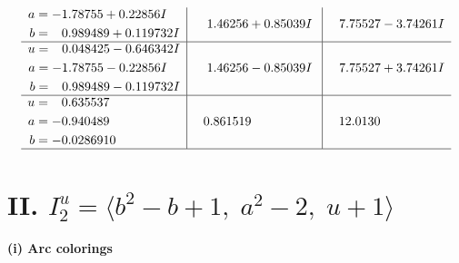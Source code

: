 \documentclass[1p]{elsarticle_modified}
\theoremstyle{definition}
\begin{document}
$$\begin{array}{c|c|c}
\begin{aligned}
a &= -1.78755 + 0.22856 I \\
b &= \phantom{-}0.989489 + 0.119732 I\end{aligned}
 & \phantom{-}1.46256 + 0.85039 I & \phantom{-}7.75527 - 3.74261 I \\ \hline\begin{aligned}
u &= \phantom{-}0.048425 - 0.646342 I \\
a &= -1.78755 - 0.22856 I \\
b &= \phantom{-}0.989489 - 0.119732 I\end{aligned}
 & \phantom{-}1.46256 - 0.85039 I & \phantom{-}7.75527 + 3.74261 I \\ \hline\begin{aligned}
u &= \phantom{-}0.635537\phantom{ +0.000000I} \\
a &= -0.940489\phantom{ +0.000000I} \\
b &= -0.0286910\phantom{ +0.000000I}\end{aligned}
 & \phantom{-}0.861519\phantom{ +0.000000I} & \phantom{-}12.0130\phantom{ +0.000000I}\\
 \hline 
 \end{array}$$\newpage\newpage\renewcommand{\arraystretch}{1}
\centering \section*{II. $I^u_{2}= \langle b^2- b+1,\;a^2-2,\;u+1 \rangle$}
\flushleft \textbf{(i) Arc colorings}\\
\end{document}
